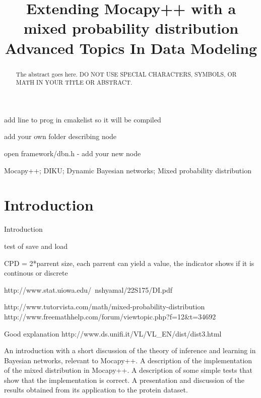 \documentclass[10pt, conference, compsocconf,a4paper]{IEEEtran}
\begin{document}
\title{Extending Mocapy++ with a mixed probability distribution\\Advanced Topics In Data Modeling}


\author{
}

\maketitle


add line to prog in cmakelist so it will be compiled

add your own folder describing node

open framework/dbn.h - add your new node





\begin{abstract}
The abstract goes here. DO NOT USE SPECIAL CHARACTERS, SYMBOLS, OR MATH IN YOUR TITLE OR ABSTRACT.

\end{abstract}

\begin{IEEEkeywords}
Mocapy++; DIKU; Dynamic Bayesian networks; Mixed probability distribution

\end{IEEEkeywords}


\section{Introduction}
Introduction

test of save and load

CPD = 2*parrent size, each parrent can yield a value, the indicator shows if it is continous or discrete


http://www.stat.uiowa.edu/~nshyamal/22S175/DI.pdf

http://www.tutorvista.com/math/mixed-probability-distribution
http://www.freemathhelp.com/forum/viewtopic.php?f=12&t=34692

Good explanation
http://www.ds.unifi.it/VL/VL_EN/dist/dist3.html


An introduction with a short discussion of the theory of inference and learning in Bayesian networks, relevant to Mocapy++.
A description of the implementation of the mixed distribution in Mocapy++. 
A description of some simple tests that show that the implementation is correct. 
A presentation and discussion of the results obtained from its application to the protein dataset.
\end{document}
